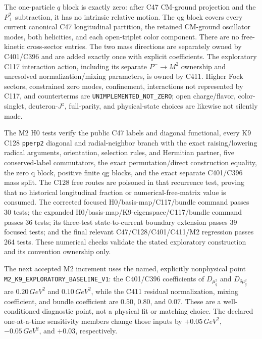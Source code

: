 \documentclass[11pt,oneside]{book}
\newcommand{\codepath}[1]{\nolinkurl{#1}}
\begin{document}
The one-particle $q$ block is exactly zero: after C47 CM-ground projection and
the $P_\perp^2$ subtraction, it has no intrinsic relative motion. The qg
block covers every current canonical C47 longitudinal partition, the retained
CM-ground oscillator modes, both helicities, and each open-triplet color
component. There are no free-kinetic cross-sector entries. The two mass
directions are separately owned by C401/C396 and are added exactly once with
explicit coefficients. The exploratory C117 interaction action, including
its separate $P^-\!\to M^2$ ownership and unresolved normalization/mixing
parameters, is owned by C411. Higher Fock sectors, constrained zero modes,
confinement, interactions not represented by C117, and counterterms are
\texttt{UNIMPLEMENTED\_NOT\_ZERO}; open charge/flavor, color-singlet,
deuteron-$J^z$, full-parity, and physical-state choices are likewise not
silently made.

The M2 H0 tests verify the public C47 labels and diagonal functional, every K9
C128 \codepath{pperp2} diagonal and radial-neighbor branch with the exact
raising/lowering radical arguments, orientation, selection rules, and
Hermitian partner, five conserved-label commutators, the exact
permutation/direct construction equality, the zero q block, positive finite
qg blocks, and the exact separate C401/C396 mass split. The C128 free routes
are poisoned in that recurrence test, proving that no historical longitudinal
fraction or numerical-free-matrix value is consumed. The corrected focused H0/basis-map/C117/bundle command
passes 30 tests; the expanded H0/basis-map/K9-eigenspace/C117/bundle command
passes 36 tests; its three-test state-to-current boundary extension passes 39
focused tests; and the final relevant C47/C128/C401/C411/M2 regression
passes 264 tests. These numerical checks validate the stated exploratory
construction and its convention ownership only.

The next accepted M2 increment uses the named, explicitly nonphysical point
\texttt{M2\_K9\_EXPLORATORY\_BASELINE\_V1}: the C401/C396 coefficients of
$D_{\mu_q^2}$ and $D_{\delta\mu_g^2}$ are $0.20\,\unit{GeV^2}$ and
$0.10\,\unit{GeV^2}$, while the C411 residual normalization, mixing
coefficient, and bundle coefficient are $0.50$, $0.80$, and $0.07$.
These are a well-conditioned diagnostic point, not a physical fit or matching
choice. The declared one-at-a-time sensitivity members change those inputs by
$+0.05\,\unit{GeV^2}$, $-0.05\,\unit{GeV^2}$, and $+0.03$, respectively.
\end{document}
